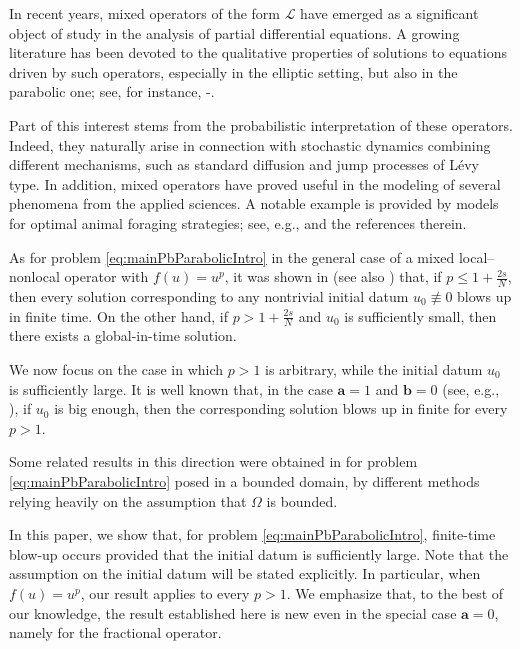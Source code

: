 \documentclass[11pt,a4paper,reqno]{amsart}
\theoremstyle{definition}
\theoremstyle{plain}
\numberwithin{equation}{section}
\begin{document}
In recent years, mixed operators of the form $\mathcal L$ have
emerged as a significant object of study in the analysis of partial
differential equations. A growing literature has been devoted to the
qualitative properties of solutions to equations driven by such
operators, especially in the elliptic setting, but also in the
parabolic one; see, for instance, \cite{Biagi2}-\cite{BonfII}.


Part of this interest stems from the probabilistic interpretation of
these operators. Indeed, they naturally arise in connection with
stochastic dynamics combining different mechanisms, such as standard
diffusion and jump processes of L\'evy type. In addition, mixed
operators have proved useful in the modeling of several phenomena from
the applied sciences. A notable example is provided by models for
optimal animal foraging strategies; see, e.g., \cite{DPLV23, DV21} and the
references therein.


As for problem \eqref{eq:mainPbParabolicIntro} in the general case of a mixed local--nonlocal
operator with $f(u)=u^p$, it was shown in \cite[Theorem 3.3]{BPV} (see also \cite{DPF, KT}) that,
if $p \le 1+\frac{2s}{N}$, then every solution corresponding to any
nontrivial initial datum $u_0 \not\equiv 0$ blows up in finite time.
On the other hand, if $p > 1+\frac{2s}{N}$ and $u_0$ is sufficiently
small, then there exists a global-in-time solution.

We now focus on the case in which $p>1$ is arbitrary, while the
initial datum $u_0$ is sufficiently large. It is well known that, in
the case $\mathbf{a}=1$ and $\mathbf{b}=0$ (see, e.g., \cite{BL,deP}), if $u_0$ is
big enough, then the corresponding solution blows up in finite for every $p>1$.

Some related results in this direction were obtained
in \cite[Theorem 1.2]{DPF} for problem \eqref{eq:mainPbParabolicIntro} posed in a bounded domain,
by different methods relying heavily on the assumption
that $\Omega$ is bounded.

\medskip

In this paper, we show that, for problem
\eqref{eq:mainPbParabolicIntro}, finite-time blow-up occurs provided
that the initial datum is sufficiently large. Note that the assumption on the initial datum will be stated explicitly. In particular, when
$f(u)=u^p$, our result applies to every $p>1$. We emphasize that, to the best of our knowledge, the result
established here is new even in the special case $\mathbf{a}=0$, namely for
the fractional operator. 
\end{document}
